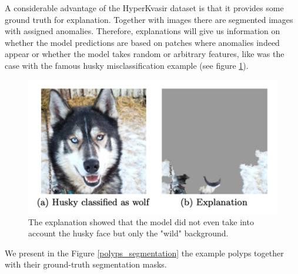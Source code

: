 \documentclass[magisterska,en]{pracamgr}
\begin{document}
A considerable advantage of the HyperKvasir dataset is that it provides some ground truth for explanation. Together with images there are segmented images with assigned anomalies. Therefore, explanations will give us information on whether the model predictions are based on patches where anomalies indeed appear or whether the model takes random or arbitrary features, like was the case with the famous husky misclassification example (see figure \ref{husky}).

\begin{figure}[H]
\centering
\includegraphics[scale=0.5]{./images/husky.png}
\caption{The explanation showed that the model did not even take into account the husky face but only the "wild" background.}
\label{husky}
\end{figure}


We present in the Figure \ref{polyps_segmentation} the example polyps together with their ground-truth segmentation masks.
\end{document}
